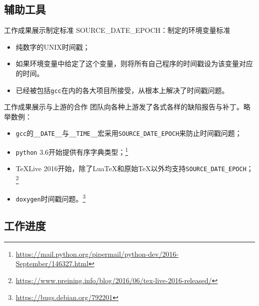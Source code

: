 \documentclass{beamer}
\begin{document}
\subsection{辅助工具}

\begin{frame}[t]{工作成果展示}{制定标准}
{\Large SOURCE\_DATE\_EPOCH：制定的环境变量标准}

\vspace{1em}
\begin{itemize}
\item 纯数字的UNIX时间戳；
\item 如果环境变量中给定了这个变量，则将所有自己程序的时间戳设为该变量对应的时间。
\item 已经被包括\texttt{gcc}在内的各大项目所接受，从根本上解决了时间戳问题。
\end{itemize}
\end{frame}
\begin{frame}[t]{工作成果展示}{与上游的合作}
团队向各种上游发了各式各样的缺陷报告与补丁。略举数例：

\vspace{1em}
\begin{itemize}
\item \texttt{gcc}的\texttt{\_\_DATE\_\_}与\texttt{\_\_TIME\_\_}宏采用\texttt{SOURCE\_DATE\_EPOCH}来防止时间戳问题；
\item \texttt{python} 3.6开始提供有序字典类型；\footnote{\url{https://mail.python.org/pipermail/python-dev/2016-September/146327.html}}
\item \TeX{}Live 2016开始，除了Lua\TeX{}和原始\TeX{}以外均支持\texttt{SOURCE\_DATE\_EPOCH}；\footnote{\url{https://www.preining.info/blog/2016/06/tex-live-2016-released/}}
\item \texttt{doxygen}时间戳问题。\footnote{\url{https://bugs.debian.org/792201}}
\end{itemize}
\end{frame}
\subsection{工作进度}
\end{document}
